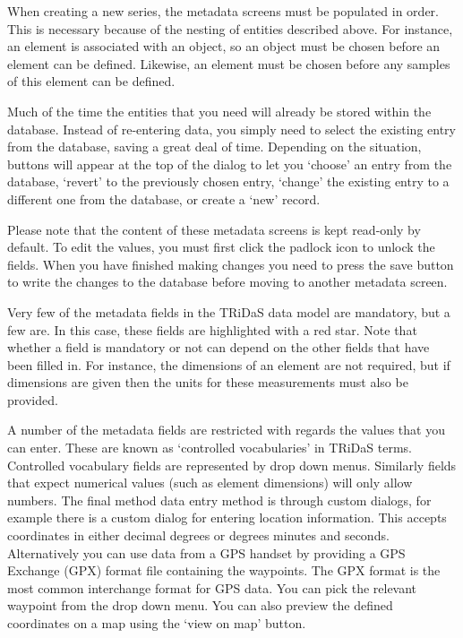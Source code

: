 When creating a new series, the metadata screens must be populated in order.  This is necessary because of the nesting of entities described above.  For instance, an element is associated with an object, so an object must be chosen before an element can be defined.  Likewise, an element must be chosen before any samples of this element can be defined.  

Much of the time the entities that you need will already be stored within the database.  Instead of re-entering data, you simply need to select the existing entry from the database, saving a great deal of time.  Depending on the situation, buttons will appear at the top of the dialog to let you `choose' an entry from the database, `revert' to the previously chosen entry, `change' the existing entry to a different one from the database, or create a `new' record.

Please note that the content of these metadata screens is kept read-only by default.  To edit the values, you must first click the padlock icon to unlock the fields.  When you have finished making changes you need to press the save button to write the changes to the database before moving to another metadata screen.

Very few of the metadata fields in the TRiDaS data model are mandatory, but a few are.  In this case, these fields are highlighted with a red star.  Note that whether a field is mandatory or not can depend on the other fields that have been filled in.  For instance, the dimensions of an element are not required, but if dimensions are given then the units for these measurements must also be provided.

A number of the metadata fields are restricted with regards the values that you can enter.  These are known as `controlled vocabularies' in TRiDaS terms.  Controlled vocabulary fields are represented by drop down menus.  Similarly fields that expect numerical values (such as element dimensions) will only allow numbers.  The final method data entry method is through custom dialogs, for example there is a custom dialog for entering location information.  This accepts coordinates in either decimal degrees or degrees minutes and seconds.  Alternatively you can use data from a GPS handset by providing a GPS Exchange (GPX) format file containing the waypoints. The GPX format is the most common interchange format for GPS data. You can pick the relevant waypoint from the drop down menu.  You can also preview the defined coordinates on a map using the `view on map' button. 

